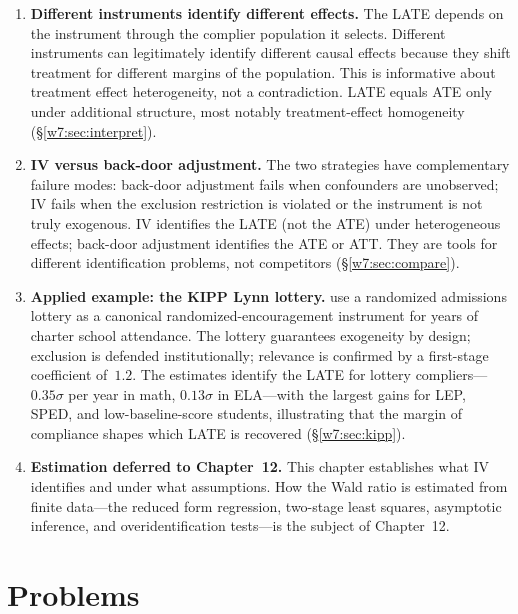 \documentclass[master.tex]{subfiles}
\begin{document}
\begin{enumerate}
  \item \textbf{Different instruments identify different effects.}
    The LATE depends on the instrument through the complier
    population it selects.  Different instruments can legitimately
    identify different causal effects because they shift treatment
    for different margins of the population.  This is informative
    about treatment effect heterogeneity, not a contradiction.
    LATE equals ATE only under additional structure, most notably
    treatment-effect homogeneity (\S\ref{w7:sec:interpret}).

  \item \textbf{IV versus back-door adjustment.}  The two
    strategies have complementary failure modes: back-door adjustment
    fails when confounders are unobserved; IV fails when the exclusion
    restriction is violated or the instrument is not truly exogenous.
    IV identifies the LATE (not the ATE) under heterogeneous effects;
    back-door adjustment identifies the ATE or ATT.  They are tools
    for different identification problems, not competitors
    (\S\ref{w7:sec:compare}).

  \item \textbf{Applied example: the KIPP Lynn lottery.}
    \citet{angrist2012benefits} use a randomized admissions lottery
    as a canonical randomized-encouragement instrument for years of
    charter school attendance.  The lottery guarantees exogeneity by
    design; exclusion is defended institutionally; relevance is
    confirmed by a first-stage coefficient of~$1.2$.  The estimates
    identify the LATE for lottery compliers---$0.35\sigma$ per year
    in math, $0.13\sigma$ in ELA---with the largest gains for LEP,
    SPED, and low-baseline-score students, illustrating that the
    margin of compliance shapes which LATE is recovered
    (\S\ref{w7:sec:kipp}).

  \item \textbf{Estimation deferred to Chapter~12.}  This chapter
    establishes what IV identifies and under what assumptions.
    How the Wald ratio is estimated from finite data---the reduced
    form regression, two-stage least squares, asymptotic inference,
    and overidentification tests---is the subject of Chapter~12.
\end{enumerate}

\section*{Problems}
\end{document}
